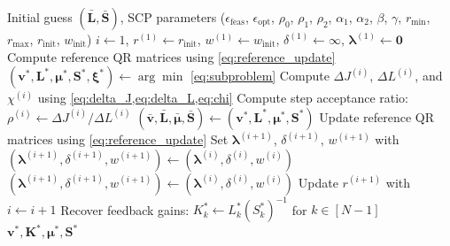 \begin{algorithm}[t]
	\caption{Square Root-Factorized CS via \texttt{SCvx*}}
	\label{alg:sqrt_qr_covariance_steering}
	\begin{algorithmic}[1]
	\Require Initial guess $(\bar{\bm{L}}, \bar{\bm{S}})$, SCP parameters ($\epsilon_{\mathrm{feas}}$, $\epsilon_{\mathrm{opt}}$, $\rho_0$, $\rho_1$, $\rho_2$, $\alpha_1$, $\alpha_2$, $\beta$, $\gamma$, $r_{\mathrm{min}}$, $r_{\mathrm{max}}$, $r_{\mathrm{init}}$, $w_{\mathrm{init}}$)
	\State $i {\gets} 1$, $r^{(1)} {\gets} r_{\mathrm{init}}$, $w^{(1)} {\gets} w_{\mathrm{init}}$, $\delta^{(1)} {\gets} \infty$, $\bm{\lambda}^{(1)} {\gets} \bm{0}$
	\State Compute reference QR matrices using \cref{eq:reference_update}
		\State $(\bm{v}^*, \bm{L}^*, \bm{\mu}^*, \bm{S}^*, \bm{\xi}^*) \gets \arg\min$ \cref{eq:subproblem}
		\State Compute $\Delta J^{(i)}$, $\Delta L^{(i)}$, and $\chi^{(i)}$ using \cref{eq:delta_J,eq:delta_L,eq:chi}
		\State Compute step acceptance ratio: $\rho^{(i)} \gets \Delta J^{(i)} / \Delta L^{(i)}$
		 
			\State $(\bar{\bm{v}}, \bar{\bm{L}}, \bar{\bm{\mu}}, \bar{\bm{S}}) \gets (\bm{v}^*, \bm{L}^*, \bm{\mu}^*, \bm{S}^*)$
			\State Update reference QR matrices using \cref{eq:reference_update}
				\State Set $\bm{\lambda}^{(i+1)}$, $\delta^{(i+1)}$, $w^{(i+1)}$ with \cite[Eq. (3)]{oguriSuccessiveConvexificationFeasibility2023a}
			\Else
			\State $(\bm{\lambda}^{(i+1)}, \delta^{(i+1)}, w^{(i+1)}) \gets (\bm{\lambda}^{(i)}, \delta^{(i)}, w^{(i)})$
			\EndIf
		\Else
			\State $(\bm{\lambda}^{(i+1)}, \delta^{(i+1)}, w^{(i+1)}) \gets (\bm{\lambda}^{(i)}, \delta^{(i)}, w^{(i)})$
		\EndIf
		\State Update $r^{(i+1)}$ with \cite[Eq. (17)]{oguriSuccessiveConvexificationFeasibility2023a}
		\State $i \gets i + 1$
	\EndWhile
	\State Recover feedback gains: $K_k^* \gets L_k^* (S_k^*)^{-1}$ for $k \in [N{-}1]$
	\State \Return $\bm{v}^*, \bm{K}^*, \bm{\mu}^*, \bm{S}^*$
	\end{algorithmic}
	\end{algorithm}

